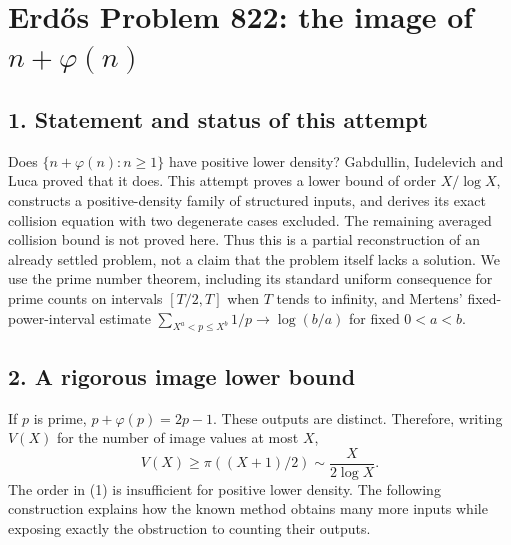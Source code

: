 \section*{Erd\H{o}s Problem 822: the image of $n+\varphi(n)$}
\subsection*{1. Statement and status of this attempt}
Does $\{n+\varphi(n):n\ge1\}$ have positive lower density? Gabdullin, Iudelevich and Luca proved that it does. This attempt proves a lower bound of order $X/\log X$, constructs a positive-density family of structured inputs, and derives its exact collision equation with two degenerate cases excluded. The remaining averaged collision bound is not proved here. Thus this is a partial reconstruction of an already settled problem, not a claim that the problem itself lacks a solution.
We use the prime number theorem, including its standard uniform consequence for prime counts on intervals $[T/2,T]$ when $T$ tends to infinity, and Mertens' fixed-power-interval estimate $\sum_{X^a<p\le X^b}1/p\to\log(b/a)$ for fixed $0<a<b$.
\subsection*{2. A rigorous image lower bound}
If $p$ is prime, $p+\varphi(p)=2p-1$. These outputs are distinct. Therefore, writing $V(X)$ for the number of image values at most $X$,
\[
 V(X)\ge\pi((X+1)/2)\sim\frac{X}{2\log X}.                \tag{1}
\]
The order in (1) is insufficient for positive lower density. The following construction explains how the known method obtains many more inputs while exposing exactly the obstruction to counting their outputs.
